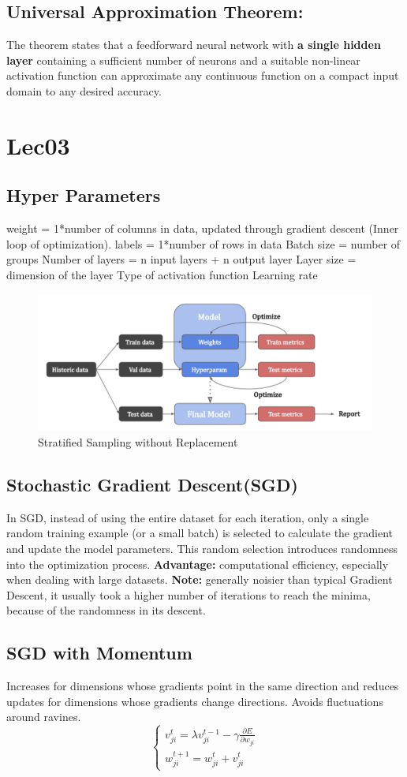 \documentclass[11pt, english]{article}
\begin{document}
\subsection{Universal Approximation Theorem:}
The theorem states that a feedforward neural network with \textbf{a single hidden layer} containing a sufficient number of neurons and a suitable non-linear activation function can approximate any continuous function on a compact input domain to any desired accuracy.

 \section{Lec03}
\subsection{Hyper Parameters}
weight = 1*number of columns in data,  updated through gradient descent (Inner loop of optimization).
labels = 1*number of rows in data
Batch size = number of groups
Number of layers = n input layers + n output layer
Layer size = dimension of the layer
Type of activation function
Learning rate
\begin{figure}
    \centering
    \includegraphics[width=0.5\linewidth]{Screenshot 2025-02-04 at 3.41.17 PM.png}
    \caption{Stratified Sampling
without Replacement}
    \label{fig:enter-label}
\end{figure}
\subsection{Stochastic Gradient Descent(SGD)}
In SGD, instead of using the entire dataset for each iteration, only a single random training example (or a small batch) is selected to calculate the gradient and update the model parameters. This random selection introduces randomness into the optimization process.
\textbf{Advantage: }computational efficiency, especially when dealing with large datasets.
\textbf{Note:} generally noisier than typical Gradient Descent, it usually took a higher number of iterations to reach the minima, because of the randomness in its descent.
\subsection{SGD with Momentum}
Increases for dimensions whose gradients point in the same direction and reduces updates for dimensions whose gradients change directions. Avoids fluctuations around ravines.
\[
\begin{cases}
v_{ji}^t = \lambda v_{ji}^{t-1} - \gamma \frac{\partial E}{\partial w_{ji}} \\
w_{ji}^{t+1} = w_{ji}^t + v_{ji}^t
\end{cases}
\]
\end{document}
